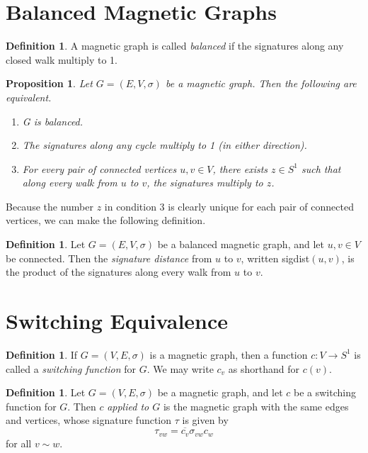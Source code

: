 \documentclass[12pt]{article}
\newtheorem{prop}[thm]{Proposition}
\theoremstyle{definition}
\newtheorem{defn}[thm]{Definition}
\begin{document}
\section{Balanced Magnetic Graphs}

\begin{defn}
A magnetic graph is called \textit{balanced} if the signatures along any closed walk multiply to 1.
\end{defn}

\begin{prop}\label{equivalent conditions for balancedness}
Let $G=(E, V, \sigma)$ be a magnetic graph. Then the following are equivalent.
\begin{enumerate}
\item G is balanced.
\item The signatures along any cycle multiply to 1 (in either direction).
\item For every pair of connected vertices $u, v \in V$, there exists $z \in S^1$ such that along every walk from $u$ to $v$, the signatures multiply to $z$. 
\end{enumerate}
\end{prop}

Because the number $z$ in condition 3 is clearly unique for each pair of connected vertices, we can make the following definition.

\begin{defn}
Let $G=(E,V, \sigma)$ be a balanced magnetic graph, and let $u, v \in V$ be connected. Then the \textit{signature distance} from $u$ to $v$, written sigdist$(u, v)$, is the product of the signatures along every walk from $u$ to $v$.
\end{defn}

\section{Switching Equivalence}

\begin{defn}
If $G=(V, E, \sigma)$ is a magnetic graph, then a function $c: V \rightarrow S^1$ is called a \textit{switching function} for $G$. We may write $c_v$ as shorthand for $c(v)$.
\end{defn}

\begin{defn}
Let $G = (V, E, \sigma)$ be a magnetic graph, and let $c$ be a switching function for $G$. Then $c$ \textit{applied to $G$} is the magnetic graph with the same edges and vertices, whose signature function $\tau$ is given by
$$\tau_{vw} = \overline{c_v}\sigma_{vw}c_w$$
for all $v \sim w$.
\end{defn}
\end{document}
